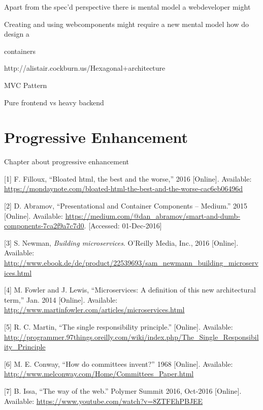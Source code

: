 \documentclass[]{assets/latex/ieee}
\begin{document}
Apart from the spec'd perspective there is mental model a webdeveloper
might

Creating and using webcomponents might require a new mental model how do
design a

containers

http://alistair.cockburn.us/Hexagonal+architecture

MVC Pattern

Pure frontend vs heavy backend

\section{Progressive Enhancement}\label{progressive-enhancement}

Chapter about progressive enhancement

\hypertarget{refs}{}
\hypertarget{ref-Filloux2016}{}
{[}1{]} F. Filloux, ``Bloated html, the best and the worse,'' 2016
{[}Online{]}. Available:
\url{https://mondaynote.com/bloated-html-the-best-and-the-worse-cac6eb06496d}

\hypertarget{ref-Abramov2015}{}
{[}2{]} D. Abramov, ``Presentational and Container Components --
Medium.'' 2015 {[}Online{]}. Available:
\url{https://medium.com/@dan_abramov/smart-and-dumb-components-7ca2f9a7c7d0}.
{[}Accessed: 01-Dec-2016{]}

\hypertarget{ref-Newman2015}{}
{[}3{]} S. Newman, \emph{Building microservices}. O'Reilly Media, Inc.,
2016 {[}Online{]}. Available:
\url{http://www.ebook.de/de/product/22539693/sam_newmann_building_microservices.html}

\hypertarget{ref-Fowler2014}{}
{[}4{]} M. Fowler and J. Lewis, ``Microservices: A definition of this
new architectural term,'' Jan. 2014 {[}Online{]}. Available:
\url{http://www.martinfowler.com/articles/microservices.html}

\hypertarget{ref-Martin}{}
{[}5{]} R. C. Martin, ``The single responsibility principle.''
{[}Online{]}. Available:
\url{http://programmer.97things.oreilly.com/wiki/index.php/The_Single_Responsibility_Principle}

\hypertarget{ref-Conway1968}{}
{[}6{]} M. E. Conway, ``How do committees invent?'' 1968 {[}Online{]}.
Available: \url{http://www.melconway.com/Home/Committees_Paper.html}

\hypertarget{ref-Issa2016}{}
{[}7{]} B. Issa, ``The way of the web.'' Polymer Summit 2016, Oct-2016
{[}Online{]}. Available:
\url{https://www.youtube.com/watch?v=8ZTFEhPBJEE}
\end{document}
